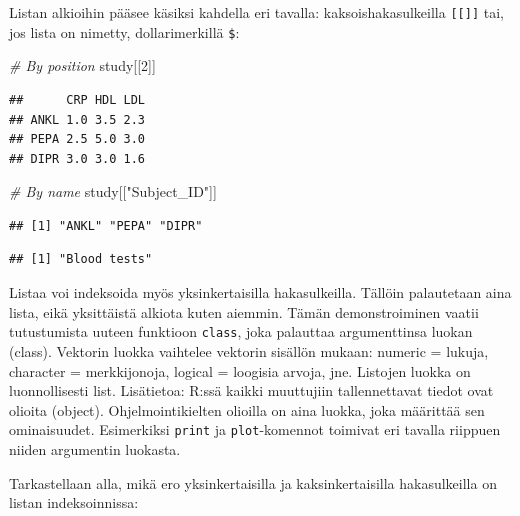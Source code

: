 \documentclass[
]{book}
\newenvironment{Shaded}{\begin{snugshade}}{\end{snugshade}}
\newcommand{\CommentTok}[1]{\textcolor[rgb]{0.56,0.35,0.01}{\textit{#1}}}
\newcommand{\DecValTok}[1]{\textcolor[rgb]{0.00,0.00,0.81}{#1}}
\newcommand{\NormalTok}[1]{#1}
\newcommand{\SpecialCharTok}[1]{\textcolor[rgb]{0.00,0.00,0.00}{#1}}
\newcommand{\StringTok}[1]{\textcolor[rgb]{0.31,0.60,0.02}{#1}}
\begin{document}
Listan alkioihin pääsee käsiksi kahdella eri tavalla: kaksoishakasulkeilla \texttt{{[}{[}{]}{]}} tai, jos lista on nimetty, dollarimerkillä \texttt{\$}:

\begin{Shaded}
\begin{Highlighting}[]
\CommentTok{\# By position}
\NormalTok{study[[}\DecValTok{2}\NormalTok{]]}
\end{Highlighting}
\end{Shaded}

\begin{verbatim}
##      CRP HDL LDL
## ANKL 1.0 3.5 2.3
## PEPA 2.5 5.0 3.0
## DIPR 3.0 3.0 1.6
\end{verbatim}

\begin{Shaded}
\begin{Highlighting}[]
\CommentTok{\# By name}
\NormalTok{study[[}\StringTok{"Subject\_ID"}\NormalTok{]]}
\end{Highlighting}
\end{Shaded}

\begin{verbatim}
## [1] "ANKL" "PEPA" "DIPR"
\end{verbatim}

\begin{Shaded}
\end{Shaded}

\begin{verbatim}
## [1] "Blood tests"
\end{verbatim}

Listaa voi indeksoida myös yksinkertaisilla hakasulkeilla. Tällöin palautetaan aina lista, eikä yksittäistä alkiota kuten aiemmin. Tämän demonstroiminen vaatii tutustumista uuteen funktioon \texttt{class}, joka palauttaa argumenttinsa luokan (class). Vektorin luokka vaihtelee vektorin sisällön mukaan: numeric = lukuja, character = merkkijonoja, logical = loogisia arvoja, jne. Listojen luokka on luonnollisesti list. Lisätietoa: R:ssä kaikki muuttujiin tallennettavat tiedot ovat olioita (object). Ohjelmointikielten olioilla on aina luokka, joka määrittää sen ominaisuudet. Esimerkiksi \texttt{print} ja \texttt{plot}-komennot toimivat eri tavalla riippuen niiden argumentin luokasta.

Tarkastellaan alla, mikä ero yksinkertaisilla ja kaksinkertaisilla hakasulkeilla on listan indeksoinnissa:
\end{document}
